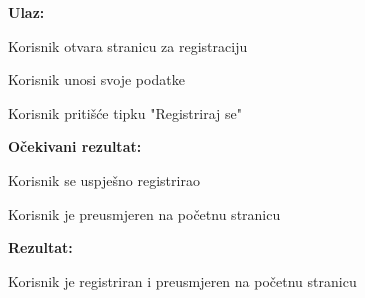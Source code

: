		 	
		 	\noindent {}
		 	\begin{packed_item}
		 		
		 	\item  \textbf{Ulaz:}
		 		
		 		\item[] \begin{packed_enum}
		 			
		 			\item Korisnik otvara stranicu za registraciju
		 			\item Korisnik unosi svoje podatke
		 			\item Korisnik pritišće tipku "Registriraj se"
		 			
		 		\end{packed_enum}
	 		
	 		\item \textbf{Očekivani rezultat:}
	 			
	 				\item[] \begin{packed_enum}
	 				
	 				\item Korisnik se uspješno registrirao
	 				\item Korisnik je preusmjeren na početnu stranicu
	 				
	 			\end{packed_enum}		
 			
 			\item \textbf{Rezultat:} 
 			
 					\item[] \begin{packed_enum}
 						
 						\item Korisnik je registriran i preusmjeren na početnu stranicu
 						
 					\end{packed_enum}	
 				
 							
		 		
		 	\end{packed_item}
	 	
